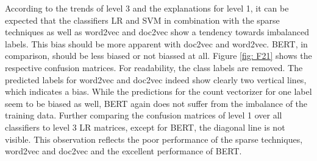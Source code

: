 \documentclass[12pt, a4paper, titlepage]{article}
\begin{document}
According to the trends of level 3 and the explanations for level 1, it can be expected that the classifiers \ac{LR} and \ac{SVM} in combination with the sparse techniques as well as word2vec and doc2vec show a tendency towards imbalanced labels. This bias should be more apparent with doc2vec and word2vec. \ac{BERT}, in comparison, should be less biased or not biassed at all. Figure \ref{fig: F21} shows the respective confusion matrices. For readability, the class labels are removed. The predicted labels for word2vec and doc2vec indeed show clearly two vertical lines, which indicates a bias. While the predictions for the count vectorizer for one label seem to be biased as well, \ac{BERT} again does not suffer from the imbalance of the training data. Further comparing the confusion matrices of level 1 over all classifiers to level 3 \ac{LR} matrices, except for \ac{BERT}, the diagonal line is not visible. This observation reflects the poor performance of the sparse techniques, word2vec and doc2vec and the excellent performance of \ac{BERT}.  
\end{document}
